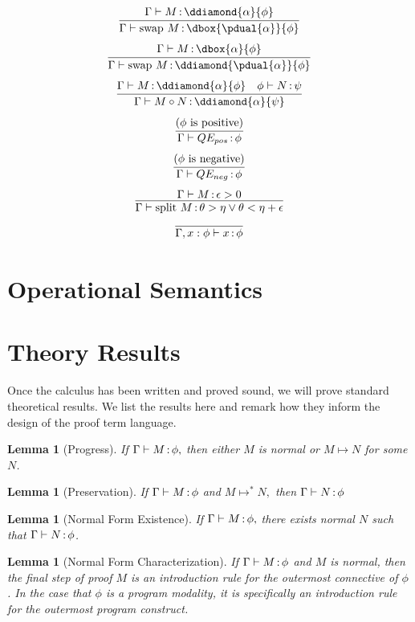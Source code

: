 \documentclass[12pt]{cmuthesis}
\newtheorem{lemma}[theorem]{Lemma}
\theoremstyle{definition}
\theoremstyle{remark}
\newcommand{\stepsto}{\mapsto}
\begin{document}
\[\infer{\proves{\G}{\eswap{M}}{\dbox{\pdual{\alpha}}{\phi}}}
        {\proves{\G}{M}{\ddiamond{\alpha}{\phi}}}\]
\[\infer{\proves{\G}{\eswap{M}}{\ddiamond{\pdual{\alpha}}{\phi}}}
        {\proves{\G}{M}{\dbox{\alpha}{\phi}}}\]
\[\infer{\proves{\G}{\emon{M}{N}}{\ddiamond{\alpha}{\psi}}}
        {\proves{\G}{M}{\ddiamond{\alpha}{\phi}} & \proves{\phi}{N}{\psi}}\]
\[\infer{\proves{\G}{\eQEpos}{\phi}}{\text{($\phi$ is positive)}}\]
\[\infer{\proves{\G}{\eQEneg}{\phi}}{\text{($\phi$ is negative)}}\]
\[\infer{\proves{\G}{\esplit{M}}{\theta > \eta \lor \theta < \eta + \epsilon}}
        {\proves{\G}{M}{\epsilon > 0}}\]
\[\infer{\proves{\G,x:\phi}{x}{\phi}}{}\]

\section{Operational Semantics}

\section{Theory Results}
Once the calculus has been written and proved sound, we will prove standard theoretical results.
We list the results here and remark how they inform the design of the proof term language.

\begin{lemma}[Progress]
If $\Gamma \vdash M\mathop{:}\phi,$ then either $M$ is normal or $M \stepsto N$ for some $N$.
\end{lemma}

\begin{lemma}[Preservation]
If $\Gamma \vdash M\mathop{:}\phi$ and $M \stepsto^* N,$ then $\Gamma \vdash N\mathop{:}\phi$
\end{lemma}

\begin{lemma}[Normal Form Existence]
\label{lem:normal-exists}
If $\Gamma \vdash M\mathop{:}\phi,$ there exists normal $N$ such that $\Gamma \vdash N\mathop{:}\phi$.
\end{lemma}

\begin{lemma}[Normal Form Characterization]
\label{lem:normal-forms}
If $\Gamma \vdash M\mathop{:}\phi$ and $M$ is normal, then the final step of proof $M$ is an introduction rule for the outermost connective of $\phi$.
In the case that $\phi$ is a program modality, it is specifically an introduction rule for the outermost program construct.
\end{lemma}
\end{document}
